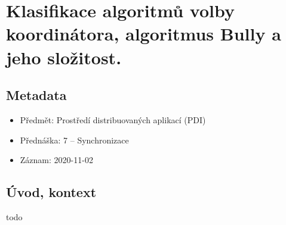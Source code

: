 

\section{Klasifikace algoritmů volby koordinátora, algoritmus Bully a jeho složitost.}

\subsection{Metadata}

\begin{itemize}
    \item Předmět: Prostředí distribuovaných aplikací (PDI)
    \item Přednáška: 7 -- Synchronizace
    \item Záznam: 2020-11-02
\end{itemize}

\subsection{Úvod, kontext}

todo
